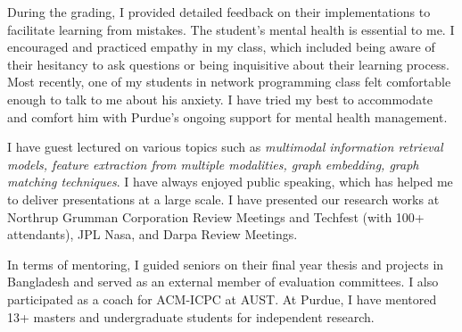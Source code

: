 \documentclass[10pt]{article}
\begin{document}
%
During the grading, I provided detailed feedback on their implementations to facilitate learning from mistakes.
The student's mental health is essential to me. I encouraged and practiced empathy in my class, which included being aware of their hesitancy to ask questions or being inquisitive about their learning process. Most recently, one of my students in network programming class felt comfortable enough to talk to me about his anxiety. I have tried my best to accommodate and comfort him with Purdue's ongoing support for mental health management.

I have guest lectured on various topics such as \textit{multimodal information retrieval models, feature extraction from multiple modalities, graph embedding, graph matching techniques}.
I have always enjoyed public speaking, which has helped me to deliver presentations at a large scale. I have presented our research works at Northrup Grumman Corporation Review Meetings and Techfest (with 100+ attendants), JPL Nasa, and Darpa Review Meetings.

In terms of mentoring, I guided seniors on their final year thesis and projects in Bangladesh and served as an external member of evaluation committees. I also participated as a coach for ACM-ICPC at AUST. At Purdue, I have mentored 13+ masters and undergraduate students for independent research.
\end{document}
